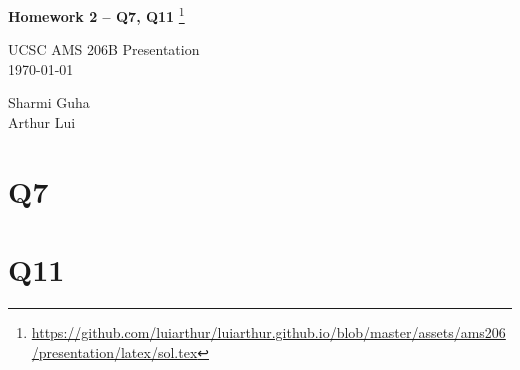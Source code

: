 \documentclass[12pt]{article}
\def\wl{\par \vspace{\baselineskip}\noindent}
\def\hline{ \textcolor{lgrey}{\hrulefill} }
\begin{document}
\begin{center}
  {\huge \textbf{Homework 2 -- Q7, Q11}
    \footnote{\url{https://github.com/luiarthur/luiarthur.github.io/blob/master/assets/ams206/presentation/latex/sol.tex}}
  }\\
  \wl
  UCSC AMS 206B Presentation\\
  \noindent\today\\
  \wl
  Sharmi Guha\\
  Arthur Lui\\
  \hline
\end{center}

\section*{Q7}


\section*{Q11}

\end{document}
